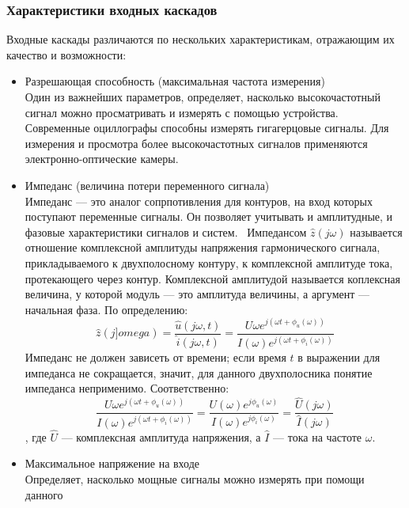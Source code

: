 \documentclass[a4paper,12pt]{report}
\numberwithin{equation}{section}
\begin{document}
\subsubsection{Характеристики входных каскадов}
Входные каскады различаются по нескольких характеристикам, отражающим их
качество и возможности:
\begin{itemize}
\item Разрешающая способность (максимальная частота измерения) \\
Один из важнейших параметров, определяет, насколько высокочастотный сигнал можно
просматривать и измерять с помощью устройства. Современные оциллографы способны
измерять гигагерцовые сигналы. Для измерения и просмотра более высокочастотных
сигналов применяются электронно-оптические камеры.~\cite{wiki:oscilloscope}
\item Импеданс (величина потери переменного сигнала) \label{impedance} \\
Импеданс --- это аналог сопрпотивления для контуров, на вход которых поступают
переменные сигналы. Он позволяет учитывать и амплитудные, и фазовые
характеристики сигналов и систем.~\cite{фейнман1977фейнмановские}
Импедансом $\hat{z}(j \omega)$ называется отношение комплексной амплитуды
напряжения гармонического сигнала, прикладываемого к двухполосному контуру, к
комплексной амплитуде тока, протекающего через контур. Комплексной амплитудой
называется коплексная величина, у которой модуль --- это амплитуда величины, а
аргумент --- начальная фаза. По определению:
\begin{equation}
\hat{z}(j ]omega) = \frac{\hat{u}(j \omega, t)}{\hat{i}(j \omega, t)} =
\frac{U{\omega} e^{j(\omega t + \phi_u(\omega))}}{I(\omega) e^{j(\omega t +
    \phi_i(\omega))}}
\end{equation}
Импеданс не должен зависеть от времени; если время $t$ в выражении для импеданса
не сокращается, значит, для данного двухполосника понятие импеданса
неприменимо. Соответственно:
\begin{equation}
\frac{U{\omega} e^{j(\omega t + \phi_u(\omega))}}{I(\omega) e^{j(\omega t +
    \phi_i(\omega))}} = \frac{U(\omega) e^{j \phi_u(\omega)}}{I(\omega) e^{j
    \phi_i(\omega)}} = \frac{\hat{U}(j \omega)}{\hat{I}(j \omega)}
\end{equation}
, где $\hat{U}$ --- комплексная амплитуда напряжения, а $\hat{I}$ --- тока на
частоте $\omega$.
\item Максимальное напряжение на входе \\
Определяет, насколько мощные сигналы можно измерять при помощи данного

\end{itemize}
\end{document}
